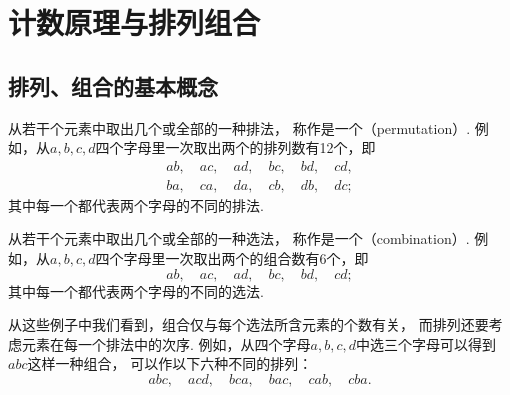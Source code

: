 \section{计数原理与排列组合}
\subsection{排列、组合的基本概念}
从若干个元素中取出几个或全部的一种排法，
称作是一个（permutation）.
例如，从\(a,b,c,d\)四个字母里一次取出两个的排列数有12个，即\begin{gather*}
	ab, \quad
	ac, \quad
	ad, \quad
	bc, \quad
	bd, \quad
	cd, \\
	ba, \quad
	ca, \quad
	da, \quad
	cb, \quad
	db, \quad
	dc;
\end{gather*}
其中每一个都代表两个字母的不同的排法.

从若干个元素中取出几个或全部的一种选法，
称作是一个（combination）.
例如，从\(a,b,c,d\)四个字母里一次取出两个的组合数有6个，即\begin{equation*}
	ab, \quad
	ac, \quad
	ad, \quad
	bc, \quad
	bd, \quad
	cd;
\end{equation*}
其中每一个都代表两个字母的不同的选法.

从这些例子中我们看到，组合仅与每个选法所含元素的个数有关，
而排列还要考虑元素在每一个排法中的次序.
例如，从四个字母\(a,b,c,d\)中选三个字母可以得到\(abc\)这样一种组合，
可以作以下六种不同的排列：\begin{equation*}
	abc, \quad
	acd, \quad
	bca, \quad
	bac, \quad
	cab, \quad
	cba.
\end{equation*}

